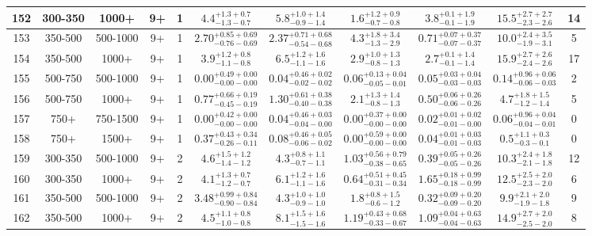 \documentclass[11pt, oneside]{article}
\begin{document}
\begin{table}
{\begin{tabular}{ |c|c|c|c|c||c|c|c|c||c|c| }
152 & 300-350 & 1000+ & 9+ & 1 & $4.4^{+1.3+0.7}_{-1.3-0.7}$ & $5.8^{+1.0+1.4}_{-0.9-1.4}$ & $1.6^{+1.2+0.9}_{-0.7-0.8}$ & $3.8^{+0.1+1.9}_{-0.1-1.9}$ & $15.5^{+2.7+2.7}_{-2.3-2.6}$ & 14 \\ \hline
153 & 350-500 & 500-1000 & 9+ & 1 & $2.70^{+0.85+0.69}_{-0.76-0.69}$ & $2.37^{+0.71+0.68}_{-0.54-0.68}$ & $4.3^{+1.8+3.4}_{-1.3-2.9}$ & $0.71^{+0.07+0.37}_{-0.07-0.37}$ & $10.0^{+2.4+3.5}_{-1.9-3.1}$ & 5 \\ \hline
154 & 350-500 & 1000+ & 9+ & 1 & $3.9^{+1.2+0.8}_{-1.1-0.8}$ & $6.5^{+1.2+1.6}_{-1.1-1.6}$ & $2.9^{+1.0+1.3}_{-0.8-1.3}$ & $2.7^{+0.1+1.4}_{-0.1-1.4}$ & $15.9^{+2.7+2.6}_{-2.4-2.6}$ & 17 \\ \hline
155 & 500-750 & 500-1000 & 9+ & 1 & $0.00^{+0.49+0.00}_{-0.00-0.00}$ & $0.04^{+0.46+0.02}_{-0.02-0.02}$ & $0.06^{+0.13+0.04}_{-0.05-0.01}$ & $0.05^{+0.03+0.04}_{-0.03-0.03}$ & $0.14^{+0.96+0.06}_{-0.06-0.03}$ & 2 \\ \hline
156 & 500-750 & 1000+ & 9+ & 1 & $0.77^{+0.66+0.19}_{-0.45-0.19}$ & $1.30^{+0.61+0.38}_{-0.40-0.38}$ & $2.1^{+1.3+1.4}_{-0.8-1.3}$ & $0.50^{+0.06+0.26}_{-0.06-0.26}$ & $4.7^{+1.8+1.5}_{-1.2-1.4}$ & 5 \\ \hline
157 & 750+ & 750-1500 & 9+ & 1 & $0.00^{+0.42+0.00}_{-0.00-0.00}$ & $0.04^{+0.46+0.03}_{-0.04-0.00}$ & $0.00^{+0.37+0.00}_{-0.00-0.00}$ & $0.02^{+0.01+0.02}_{-0.01-0.00}$ & $0.06^{+0.96+0.04}_{-0.04-0.01}$ & 0 \\ \hline
158 & 750+ & 1500+ & 9+ & 1 & $0.37^{+0.43+0.34}_{-0.26-0.11}$ & $0.08^{+0.46+0.05}_{-0.06-0.02}$ & $0.00^{+0.59+0.00}_{-0.00-0.00}$ & $0.04^{+0.01+0.03}_{-0.01-0.03}$ & $0.5^{+1.1+0.3}_{-0.3-0.1}$ & 0 \\ \hline
159 & 300-350 & 500-1000 & 9+ & 2 & $4.6^{+1.5+1.2}_{-1.4-1.2}$ & $4.3^{+0.8+1.1}_{-0.7-1.1}$ & $1.03^{+0.56+0.79}_{-0.38-0.65}$ & $0.39^{+0.05+0.26}_{-0.05-0.26}$ & $10.3^{+2.4+1.8}_{-2.1-1.8}$ & 12 \\ \hline
160 & 300-350 & 1000+ & 9+ & 2 & $4.1^{+1.3+0.7}_{-1.2-0.7}$ & $6.1^{+1.2+1.6}_{-1.1-1.6}$ & $0.64^{+0.51+0.45}_{-0.31-0.34}$ & $1.65^{+0.18+0.99}_{-0.18-0.99}$ & $12.5^{+2.5+2.0}_{-2.3-2.0}$ & 6 \\ \hline
161 & 350-500 & 500-1000 & 9+ & 2 & $3.48^{+0.99+0.84}_{-0.90-0.84}$ & $4.3^{+1.0+1.0}_{-0.9-1.0}$ & $1.8^{+0.8+1.5}_{-0.6-1.2}$ & $0.32^{+0.09+0.20}_{-0.09-0.20}$ & $9.9^{+2.1+2.0}_{-1.9-1.8}$ & 9 \\ \hline
162 & 350-500 & 1000+ & 9+ & 2 & $4.5^{+1.1+0.8}_{-1.0-0.8}$ & $8.1^{+1.5+1.6}_{-1.5-1.6}$ & $1.19^{+0.43+0.68}_{-0.33-0.67}$ & $1.09^{+0.04+0.63}_{-0.04-0.63}$ & $14.9^{+2.7+2.0}_{-2.5-2.0}$ & 8 \\ \hline

\end{tabular}}
\end{table}
\end{document}
